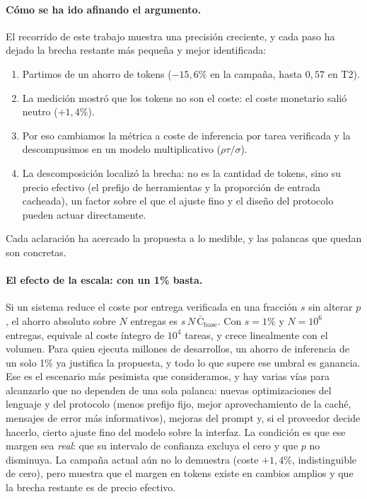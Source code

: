 \documentclass[11pt, a4paper]{article}
\newcommand{\pc}{\mbox{\%}}
\newcommand{\cost}{\mathrm{C}}
\begin{document}
\paragraph{Cómo se ha ido afinando el argumento.} El recorrido de este trabajo muestra una precisión creciente, y cada paso ha dejado la brecha restante más pequeña y mejor identificada:
\begin{enumerate}[nosep]
  \item Partimos de un ahorro de tokens ($-15{,}6\pc$ en la campaña, hasta $0{,}57$ en T2).
  \item La medición mostró que los tokens no son el coste: el coste monetario salió neutro ($+1{,}4\pc$).
  \item Por eso cambiamos la métrica a coste de inferencia por tarea verificada y la descompusimos en un modelo multiplicativo ($\rho\tau/\sigma$).
  \item La descomposición localizó la brecha: no es la cantidad de tokens, sino su precio efectivo (el prefijo de herramientas y la proporción de entrada cacheada), un factor sobre el que el ajuste fino y el diseño del protocolo pueden actuar directamente.
\end{enumerate}
Cada aclaración ha acercado la propuesta a lo medible, y las palancas que quedan son concretas.

\paragraph{El efecto de la escala: con un 1\pc{} basta.} Si un sistema reduce el coste por entrega verificada en una fracción $s$ sin alterar $p$, el ahorro absoluto sobre $N$ entregas es $s\,N\,\bar{\cost}_{\mathrm{base}}$. Con $s=1\pc$ y $N=10^{6}$ entregas, equivale al coste íntegro de $10^{4}$ tareas, y crece linealmente con el volumen. Para quien ejecuta millones de desarrollos, un ahorro de inferencia de un solo 1\pc{} ya justifica la propuesta, y todo lo que supere ese umbral es ganancia. Ese es el escenario más pesimista que consideramos, y hay varias vías para alcanzarlo que no dependen de una sola palanca: nuevas optimizaciones del lenguaje y del protocolo (menos prefijo fijo, mejor aprovechamiento de la caché, mensajes de error más informativos), mejoras del prompt y, si el proveedor decide hacerlo, cierto ajuste fino del modelo sobre la interfaz. La condición es que ese margen sea \emph{real}: que su intervalo de confianza excluya el cero y que $p$ no disminuya. La campaña actual aún no lo demuestra (coste $+1{,}4\pc$, indistinguible de cero), pero muestra que el margen en tokens existe en cambios amplios y que la brecha restante es de precio efectivo.
\end{document}

